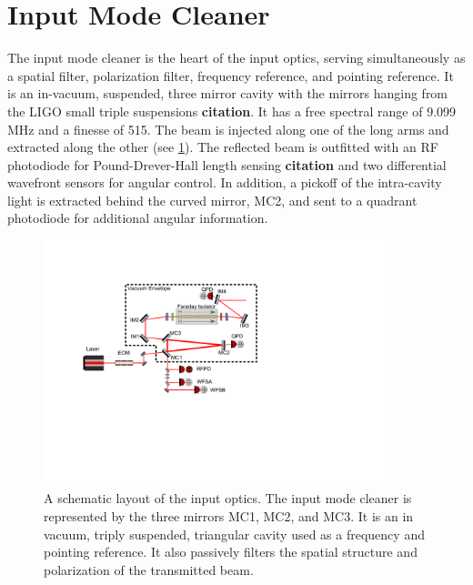 
\section{Input Mode Cleaner}
\label{sec:input_mode_cleaner}

The input mode cleaner is the heart of the input optics, serving simultaneously as a spatial filter, 
polarization filter, frequency reference, and pointing reference.  
It is an in-vacuum, suspended, three mirror cavity with the mirrors hanging from the LIGO small triple 
suspensions \textbf{citation}.  
It has a free spectral range of 9.099 MHz and a finesse of 515.  
The beam is injected along one of the long arms and extracted along the other (see \ref{fig:ioAll}).  
The reflected beam is outfitted with an RF photodiode for Pound-Drever-Hall length sensing \textbf{citation} 
and two differential wavefront sensors for angular control.  
In addition, a pickoff of the intra-cavity light is extracted behind the curved mirror, MC2, and sent to a 
quadrant photodiode for additional angular information.  

\begin{figure}
	\centering
	\includegraphics[width=0.9\textwidth, trim=3.5cm 7.5cm 11cm 3.5cm]{IO_Drawing.pdf}
	\caption{A schematic layout of the input optics\cite{franzen_optics_drawings}.  
		The input mode cleaner is represented by the three mirrors MC1, MC2, and MC3.  
		It is an in vacuum, triply suspended, triangular cavity used as a frequency 
		and pointing reference.  It also passively filters the spatial structure 
		and polarization of the transmitted beam.}
	\label{fig:ioAll}
\end{figure}


